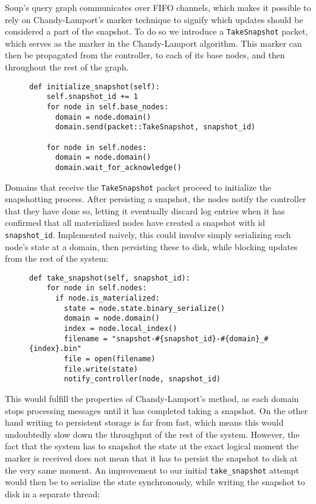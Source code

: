 \documentclass[b5paper]{report}
\begin{document}
Soup's query graph communicates over FIFO channels, which makes it possible to
rely on Chandy-Lamport's marker technique to signify which updates should be
considered a part of the snapshot. To do so we introduce a \texttt{TakeSnapshot}
packet, which serves as the marker in the Chandy-Lamport algorithm. This marker
can then be propagated from the controller, to each of its base nodes, and then
throughout the rest of the graph.

\begin{figure}[H]
  \begin{lstlisting}[caption="Initating a snapshot from the controller"]
  def initialize_snapshot(self):
    self.snapshot_id += 1
    for node in self.base_nodes:
      domain = node.domain()
      domain.send(packet::TakeSnapshot, snapshot_id)

    for node in self.nodes:
      domain = node.domain()
      domain.wait_for_acknowledge()
  \end{lstlisting}
\end{figure}

Domains that receive the \texttt{TakeSnapshot} packet proceed to initialize the
snapshotting process. After persisting a snapshot, the nodes notify the
controller that they have done so, letting it eventually discard log entries
when it has confirmed that all materialized nodes have created a snapshot with
id \texttt{snapshot\_id}. Implemented naively, this could involve simply
serializing each node's state at a domain, then persisting these to disk, while
blocking updates from the rest of the system:

\begin{figure}[H]
  \begin{lstlisting}[caption="Naive beginning of a snapshot implementation for domains"]
  def take_snapshot(self, snapshot_id):
    for node in self.nodes:
      if node.is_materialized:
        state = node.state.binary_serialize()
        domain = node.domain()
        index = node.local_index()
        filename = "snapshot-#{snapshot_id}-#{domain}_#{index}.bin"
        file = open(filename)
        file.write(state)
        notify_controller(node, snapshot_id)

  \end{lstlisting}
\end{figure}

This would fulfill the properties of Chandy-Lamport's method, as each domain
stops processing messages until it has completed taking a snapshot. On the other
hand writing to persistent storage is far from fast, which means this would
undoubtedly slow down the throughput of the rest of the system. However, the
fact that the system has to snapshot the state at the exact logical moment the
marker is received does not mean that it has to persist the snapshot to disk at
the very same moment. An improvement to our initial \texttt{take\_snapshot}
attempt would then be to serialize the state synchronously, while writing the
snapshot to disk in a separate thread:
\end{document}
